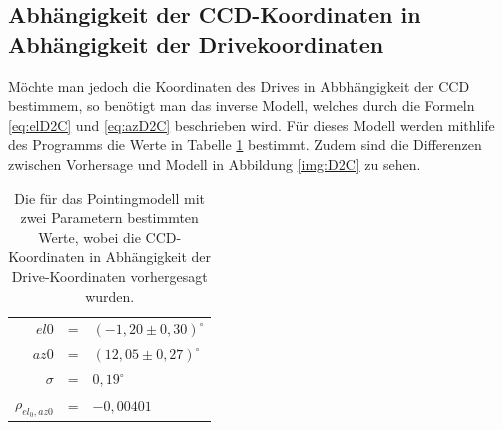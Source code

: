 
\subsection{Abhängigkeit der CCD-Koordinaten in Abhängigkeit der Drivekoordinaten}
Möchte man jedoch die Koordinaten des Drives in Abbhängigkeit der CCD bestimmem, so benötigt man das inverse Modell, welches durch die Formeln \ref{eq:elD2C} und \ref{eq:azD2C} beschrieben wird. Für dieses Modell werden mithlife des Programms die Werte in Tabelle \ref{tab:D2C} bestimmt. Zudem sind die Differenzen zwischen Vorhersage und Modell in Abbildung  \ref{img:D2C} zu sehen.
\begin{table}[htbp]
\centering
\begin{tabular}{rcl}
\toprule
$el0$ &=& $(-1,20\pm0,30)^{\circ}$\\
$az0$ &=& $(12,05\pm0,27)^{\circ}$\\
$\sigma$ &=& $0,19^{\circ}$\\
$\rho_{el_0,az0}$ &=& $-0,00401$\\
\bottomrule
\end{tabular}
\label{tab:D2C}
\caption{Die für das Pointingmodell mit zwei Parametern bestimmten Werte, wobei die CCD-Koordinaten in Abhängigkeit der Drive-Koordinaten vorhergesagt wurden.}
\end{table}


